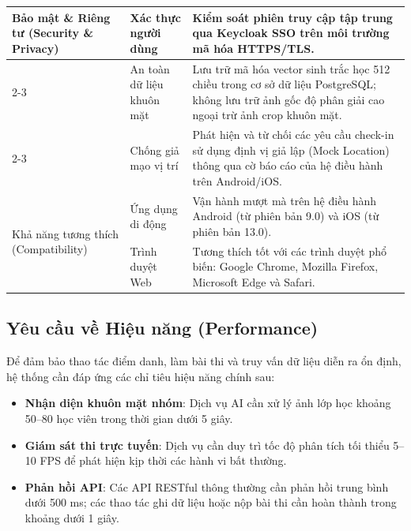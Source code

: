 \documentclass[../DoAn.tex]{subfiles}
\begin{document}
\begin{longtable}{|p{3cm}|p{3.5cm}|p{8.2cm}|}
        \multirow{3}{3cm}{Bảo mật \& Riêng tư (Security \& Privacy)} & Xác thực người dùng & Kiểm soát phiên truy cập tập trung qua Keycloak SSO \cite{keycloak2026} trên môi trường mã hóa HTTPS/TLS. \\ \cline{2-3}
         & An toàn dữ liệu khuôn mặt & Lưu trữ mã hóa vector sinh trắc học 512 chiều trong cơ sở dữ liệu PostgreSQL; không lưu trữ ảnh gốc độ phân giải cao ngoại trừ ảnh crop khuôn mặt. \\ \cline{2-3}
          & Chống giả mạo vị trí & Phát hiện và từ chối các yêu cầu check-in sử dụng định vị giả lập (Mock Location) thông qua cờ báo cáo của hệ điều hành trên Android/iOS. \\ \hline
        \multirow{2}{3cm}{Khả năng tương thích (Compatibility)} & Ứng dụng di động & Vận hành mượt mà trên hệ điều hành Android (từ phiên bản 9.0) và iOS (từ phiên bản 13.0). \\ \cline{2-3}
         & Trình duyệt Web & Tương thích tốt với các trình duyệt phổ biến: Google Chrome, Mozilla Firefox, Microsoft Edge và Safari. \\ \hline
\end{longtable}

\iffalse
\subsection{Yêu cầu về Hiệu năng (Performance)}
Để đảm bảo thao tác điểm danh, làm bài thi và truy vấn dữ liệu diễn ra ổn định, hệ thống cần đáp ứng các chỉ tiêu hiệu năng chính sau:
\begin{itemize}
    \item \textbf{Nhận diện khuôn mặt nhóm}: Dịch vụ AI cần xử lý ảnh lớp học khoảng 50--80 học viên trong thời gian dưới 5 giây.
    \item \textbf{Giám sát thi trực tuyến}: Dịch vụ  cần duy trì tốc độ phân tích tối thiểu 5--10 FPS để phát hiện kịp thời các hành vi bất thường.
    \item \textbf{Phản hồi API}: Các API RESTful thông thường cần phản hồi trung bình dưới 500 ms; các thao tác ghi dữ liệu hoặc nộp bài thi cần hoàn thành trong khoảng dưới 1 giây.
\end{itemize}
\end{document}
